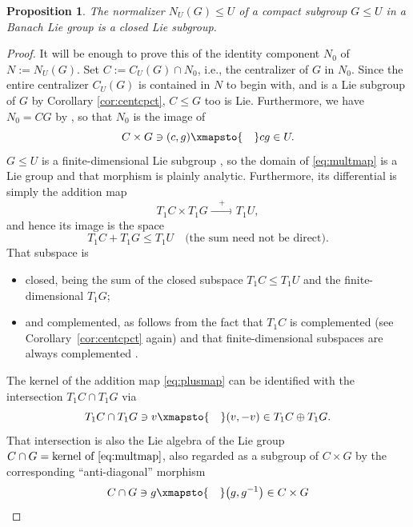 \documentclass[10pt,a4paper]{amsart}
\numberwithin{equation}{section}
\newtheorem{Proposition}[Theorem]{Proposition}
 { \theoremstyle{definition}
\newtheorem{Definition}[Theorem]{Definition}
\newtheorem{Note}[Theorem]{Note}
\newtheorem{Notation}[Theorem]{Notation}
\newtheorem{Example}[Theorem]{Example}
\newtheorem{Examples}[Theorem]{Examples}
\newtheorem{Remark}[Theorem]{Remark}
\newtheorem{Remarks}[Theorem]{Remarks}
\newtheorem{Convention}[Theorem]{Convention}
}
\begin{document}
\begin{Proposition}\label{pr:normcpct}
 The normalizer $N_U(G)\le U$ of a compact subgroup $G\le U$ in a Banach Lie group is a closed Lie subgroup.
\end{Proposition}
\begin{proof}
 It will be enough to prove this of the identity component $N_0$ of $N:=N_U(G)$. Set $C:=C_U(G)\cap N_0$,
 i.e., the centralizer of $G$ in $N_0$. Since the entire centralizer $C_U(G)$ is contained in $N$ to begin with, and is a Lie subgroup of $G$ by Corollary \ref{cor:centcpct}, $C\le G$ too is Lie. Furthermore, we have~$N_0=CG$ by \cite[Theorem 2]{iw}, so that $N_0$ is the image of
 \begin{equation}\label{eq:multmap}
 C\times G\ni (c,g)\xmapsto{\quad} cg\in U.
 \end{equation}
 $G \le U$ is a finite-dimensional Lie subgroup \cite[Theorem IV.3.16]{neeb-lc}, so the domain of \eqref{eq:multmap} is a Lie group and that morphism is plainly analytic. Furthermore, its differential is simply the addition map
 \begin{equation*}
 T_1C\times T_1G\xrightarrow{\quad + \quad}T_1U,
 \end{equation*}
 and hence its image is the space
 \begin{equation}\label{eq:plusmap}
 T_1C + T_1G\le T_1U\quad\text{(the sum need not be direct)}.
 \end{equation}
 That subspace is
 \begin{itemize}\itemsep=0pt
 \item closed, being the sum of the closed subspace $T_1C\le T_1U$ and the finite-dimensional $T_1G$;
 \item and complemented, as follows from the fact that $T_1C$ is complemented (see Corollary~\ref{cor:centcpct} again) and that finite-dimensional subspaces are always complemented \cite[Theorem \mbox{7-3-6}]{wil-tvs}.
 \end{itemize}
 The kernel of the addition map \eqref{eq:plusmap} can be identified with the intersection $T_1C\cap T_1G$ via
 \begin{equation*}
 T_1C\cap T_1G\ni v\xmapsto{\quad} (v,-v)\in T_1C\oplus T_1G.
 \end{equation*}
 That intersection is also the Lie algebra of the Lie group $C\cap G = \text{kernel of \eqref{eq:multmap}}$,
 also regarded as a subgroup of $C\times G$ by the corresponding ``anti-diagonal'' morphism
 \begin{equation*}
 C\cap G\ni g\xmapsto{\quad} \big(g,g^{-1}\big)\in C\times G

\end{equation*}
\end{proof}
\end{document}
